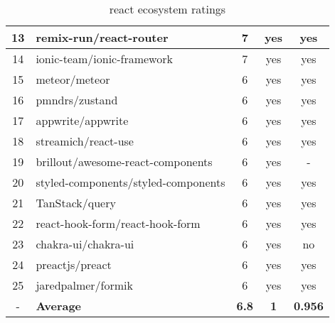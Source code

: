 \begin{table}[H]
\begin{tabular}{|c|l|c|c|c|}
        13 & remix-run/react-router              & 7                  & yes                        & yes                \\ \hline
        14 & ionic-team/ionic-framework          & 7                  & yes                        & yes                \\ \hline
        15 & meteor/meteor                       & 6                  & yes                        & yes                \\ \hline
        16 & pmndrs/zustand                      & 6                  & yes                        & yes                \\ \hline
        17 & appwrite/appwrite                   & 6                  & yes                        & yes                \\ \hline
        18 & streamich/react-use                 & 6                  & yes                        & yes                \\ \hline
        19 & brillout/awesome-react-components   & 6                  & yes                        & -                  \\ \hline
        20 & styled-components/styled-components & 6                  & yes                        & yes                \\ \hline
        21 & TanStack/query                      & 6                  & yes                        & yes                \\ \hline
        22 & react-hook-form/react-hook-form     & 6                  & yes                        & yes                \\ \hline
        23 & chakra-ui/chakra-ui                 & 6                  & yes                        & no                 \\ \hline
        24 & preactjs/preact                     & 6                  & yes                        & yes                \\ \hline
        25 & jaredpalmer/formik                  & 6                  & yes                        & yes                \\ \hline
        -  & \textbf{Average}                    & \textbf{6.8}       & \textbf{1}                 & \textbf{0.956}     \\ \hline
    \end{tabular}
    \caption{react ecosystem ratings}
    \label{tab:metrics:react:ratings}
\end{table}

